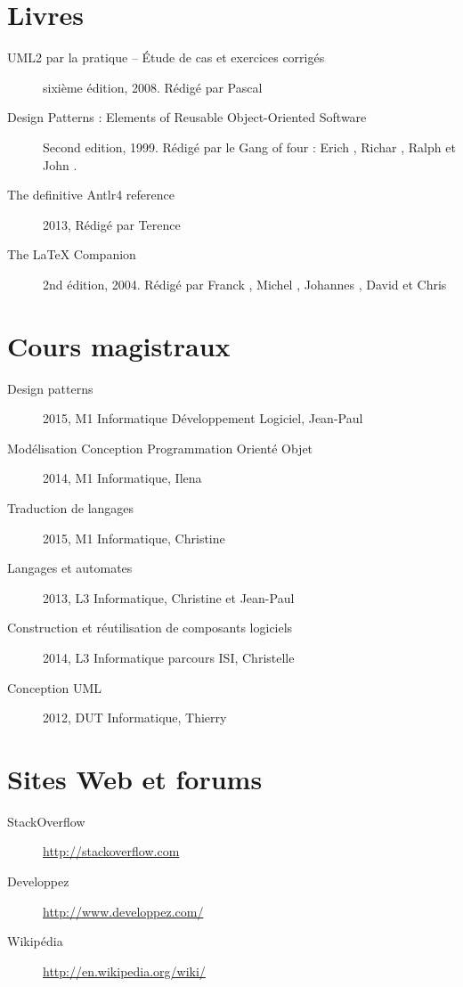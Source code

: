 \section{Livres}
	\begin{description}
	\item[UML2 par la pratique -- \'Etude de cas et exercices corrigés] sixième édition, 2008. Rédigé par Pascal 
	\item[Design Patterns : Elements of Reusable Object-Oriented Software] Second edition, 1999. Rédigé par le Gang of four : Erich , Richar , Ralph  et John .	
		\item[The definitive Antlr4 reference] 2013, Rédigé par Terence 
	\item[The \LaTeX{} Companion] 2nd édition, 2004. Rédigé par Franck , Michel , Johannes , David  et Chris  
\end{description}
\section{Cours magistraux}
\begin{description}
	\item[Design patterns] 2015, M1 Informatique Développement Logiciel, Jean-Paul 
	\item[Modélisation Conception Programmation Orienté Objet] 2014, M1 Informatique, Ilena 
	\item[Traduction de langages] 2015, M1 Informatique, Christine 
	\item[Langages et automates] 2013, L3 Informatique, Christine  et Jean-Paul 
	\item[Construction et réutilisation de composants logiciels] 2014, L3 Informatique parcours ISI, Christelle 
	\item[Conception UML] 2012, DUT Informatique, Thierry 
\end{description}
\section{Sites Web et forums}
	\begin{description}
		\item[StackOverflow] \url{http://stackoverflow.com}
		\item[Developpez] \url{http://www.developpez.com/}
		\item[Wikipédia] \url{http://en.wikipedia.org/wiki/}
	\end{description}

